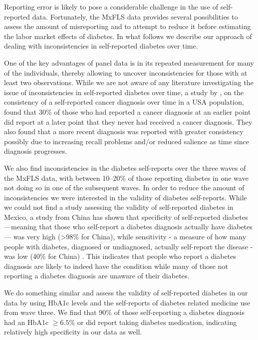 \documentclass[12pt,english]{article}
\begin{document}
{\begin{appendix}
Reporting error is likely to pose a considerable challenge in the use of self-reported data. Fortunately, the \ac{MxFLS} data provides several possibilities to assess the amount of misreporting and to attempt to reduce it before estimating the labor market effects of diabetes. In what follows we describe our approach of dealing with inconsistencies in self-reported diabetes over time.

One of the key advantages of panel data is in its repeated measurement for many of the individuals, thereby allowing to uncover inconsistencies for those with at least two observations. While we are not aware of any literature investigating the issue of inconsistencies in self-reported diabetes over time, a study by \textcite{Zajacova2010}, on the consistency of a self-reported cancer diagnosis over time in a USA population, found that 30\% of those who had reported a cancer diagnosis at an earlier point did report at a later point that they never had received a cancer diagnosis. They also found that a more recent diagnosis was reported with greater consistency possibly due to increasing recall problems and/or reduced salience as time since diagnosis progresses.

We also find inconsistencies in the diabetes self-reports over the three waves of the \ac{MxFLS} data, with between 10--20\% of those reporting diabetes in one wave not doing so in one of the subsequent waves. In order to reduce the amount of inconsistencies we were interested in the validity of diabetes self-reports. While we could not find a study assessing the validity of self-reported diabetes in Mexico, a study from China has shown that specificity of self-reported diabetes ---meaning that those who self-report a diabetes diagnosis actually have diabetes--- was very high (>98\% for China), while sensitivity - a measure
of how many people with diabetes, diagnosed or undiagnosed, actually self-report the disease - was low (40\% for China) \parencite{Yuan2015}. This indicates that people who report a diabetes diagnosis are likely to indeed have the condition while many of those not reporting a diabetes diagnosis are unaware of their diabetes.

We do something similar and assess the validity of self-reported diabetes in our data by using \ac{HbA1c} levels and the self-reports of diabetes related medicine use from wave three. We find that 90\% of those self-reporting a diabetes diagnosis had an \ac{HbA1c} $\geq6.5$\% or did report taking diabetes medication, indicating relatively high specificity in our data as well.


\end{appendix}}
\end{document}

